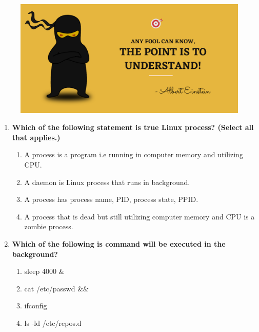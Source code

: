 \setlength{\columnsep}{3pt}
\begin{flushleft}
	
	\paragraph{}
	\bigskip
	
	\begin{figure}[h!]
		\centering
		\includegraphics[scale=.2]{content/practise.jpg}
	\end{figure}	
	\begin{enumerate}
		
		\item \textbf{Which of the following statement is true Linux process? (Select all that applies.)}
		\begin{enumerate}[label=(\alph*)]
			\item A process is a program i.e running in computer memory and utilizing CPU.  %
			\item A daemon is Linux process that runs in background. %
			\item A process has process name, PID, process state, PPID. %
			\item A process that is dead but still utilizing computer memory and CPU is a zombie process. %
		\end{enumerate}
		\bigskip
		\bigskip
		
		\item \textbf{Which of the following is command will be executed in the background?}
		\begin{enumerate}[label=(\alph*)]
			\item sleep 4000 \&  %
			\item cat /etc/passwd  \&\& %
			\item ifconfig 
			\item ls -ld /etc/repos.d
		\end{enumerate}
		\bigskip
		\bigskip	
		

\end{enumerate}
\end{flushleft}
